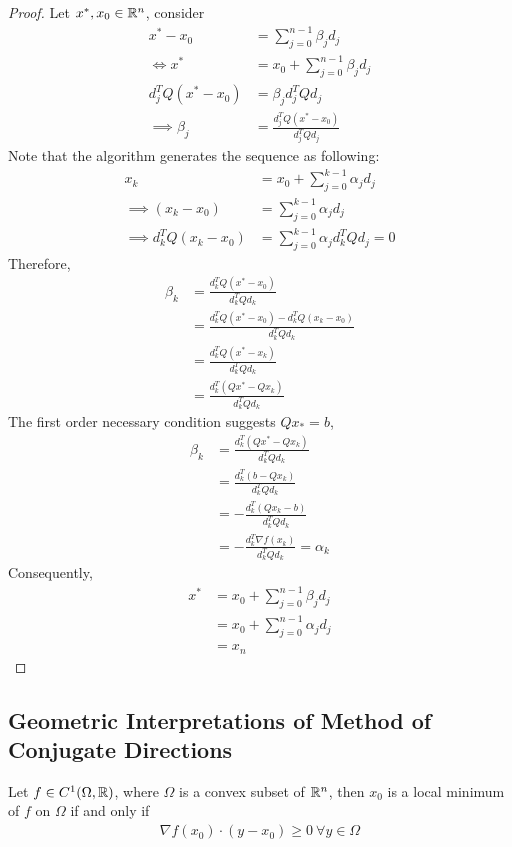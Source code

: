 \documentclass{article}
\begin{document}
	\begin{proof}
		Let $x^*, x_0 \in \mathbb{R}^n$, consider
		\begin{align}
			x^* - x_0 &= \sum_{j=0}^{n-1} \beta_j d_j \\
			\iff x^* &= x_0 + \sum_{j=0}^{n-1} \beta_j d_j \\
			d_j^T Q (x^* - x_0) &= \beta_j d_j^T Q d_j \\
			\implies \beta_j &= \frac{d_j^T Q(x^* - x_0)}{d_j^T Q d_j}
		\end{align}
		Note that the algorithm generates the sequence as following:
		\begin{align}
			x_k &= x_0 + \sum_{j=0}^{k-1} \alpha_j d_j \\
			\implies (x_k - x_0) &= \sum_{j=0}^{k-1} \alpha_j d_j \\
			\implies d_k^T Q (x_k - x_0) &= \sum_{j=0}^{k-1} \alpha_j d_k^T Q d_j = 0
		\end{align}
		Therefore, 
		\begin{align}
			\beta_k &= \frac{d_k^T Q(x^* - x_0)}{d_k^T Q d_k} \\
			&= \frac{d_k^T Q(x^* - x_0) - d_k^T Q (x_k - x_0)}{d_k^T Q d_k} \\
			&= \frac{d_k^T Q(x^* - x_k)}{d_k^T Q d_k} \\
			&= \frac{d_k^T (Qx^* - Qx_k)}{d_k^T Q d_k}
		\end{align}
		The first order necessary condition suggests $Qx_* = b$,
		\begin{align}
			\beta_k &= \frac{d_k^T (Qx^* - Qx_k)}{d_k^T Q d_k} \\
			&= \frac{d_k^T (b - Qx_k)}{d_k^T Q d_k}  \\
			&= - \frac{d_k^T (Qx_k - b)}{d_k^T Q d_k} \\
			&= - \frac{d_k^T \nabla f(x_k)}{d_k^T Q d_k} = \alpha_k
		\end{align}
		Consequently, 
		\begin{align}
			x^* &= x_0 + \sum_{j=0}^{n-1} \beta_j d_j \\
			&= x_0 + \sum_{j=0}^{n-1} \alpha_j d_j \\
			&= x_n
		\end{align}
	\end{proof}
	
	\subsection{Geometric Interpretations of Method of Conjugate Directions}
	\begin{theorem}
		Let $f \in C^1(\Omega, \mathbb{R})$, where $\Omega$ is a convex subset of $\mathbb{R}^n$, then $x_0$ is a local minimum of $f$ on $\Omega$ if and only if 
		\begin{align}
			\nabla f(x_0) \cdot (y - x_0) \geq 0\ \forall y \in \Omega
		\end{align}
	\end{theorem}
	
\end{document}
